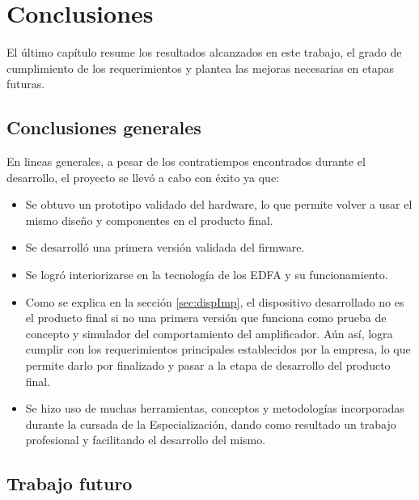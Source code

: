 
\chapter{Conclusiones} %

\label{Chapter5} %



El último capítulo resume los resultados alcanzados en este trabajo, el grado de cumplimiento de los requerimientos y plantea las mejoras necesarias en etapas futuras.

\section{Conclusiones generales}

En lineas generales, a pesar de los contratiempos encontrados durante el desarrollo, el proyecto se llevó a cabo con éxito ya que:  

\begin{itemize}
\item Se obtuvo un prototipo validado del hardware, lo que permite volver a usar el mismo diseño y componentes en el producto final.
\item Se desarrolló una primera versión validada del firmware.
\item Se logró interiorizarse en la tecnología de los EDFA y su funcionamiento.
\item Como se explica en la sección \ref{sec:dispImp}, el dispositivo desarrollado no es el producto final si no una primera versión que funciona como prueba de concepto y simulador del comportamiento del amplificador. Aún así, logra cumplir con los requerimientos principales establecidos por la empresa, lo que permite darlo por finalizado y pasar a la etapa de desarrollo del producto final.
\item Se hizo uso de muchas herramientas, conceptos y metodologías incorporadas durante la cursada de la Especialización, dando como resultado un trabajo profesional y facilitando el desarrollo del mismo.
\end{itemize}

\section{Trabajo futuro}

